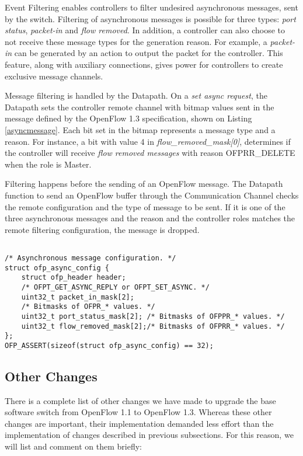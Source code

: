     Event Filtering enables controllers to filter undesired asynchronous messages, sent by the switch. Filtering of asynchronous messages is possible for three types: \textit{port status}, \textit{packet-in} and \textit{flow removed}. In addition, a controller can also choose to not receive these message types for the generation reason. For example, a \textit{packet-in} can be generated by an action to output the packet for the controller. This feature, along with auxiliary connections, gives power for controllers to create exclusive message channels.
    
    Message filtering is handled by the Datapath. On a \textit{set async request}, the Datapath sets the controller remote channel with bitmap values sent in the message defined by the OpenFlow 1.3 specification, shown on Listing \ref{asyncmessage}. Each bit set in the bitmap represents a message type and a reason. For instance, a bit with value 4 in \textit{flow_removed_mask[0]}, determines if the controller will receive \textit{flow removed messages} with reason OFPRR_DELETE when the role is Master.  
    
    Filtering happens before the sending of an OpenFlow message. The Datapath function to send an OpenFlow buffer through the Communication Channel checks the remote configuration and the type of message to be sent. If it is one of the three asynchronous messages and the reason and the controller roles matches the remote filtering configuration, the message is dropped. 
    
\begin{lstlisting}[caption={Ethernet parsing in the nbee_link module}, label=asyncmessage,]    

/* Asynchronous message configuration. */
struct ofp_async_config {
    struct ofp_header header;
    /* OFPT_GET_ASYNC_REPLY or OFPT_SET_ASYNC. */
    uint32_t packet_in_mask[2];
    /* Bitmasks of OFPR_* values. */
    uint32_t port_status_mask[2]; /* Bitmasks of OFPPR_* values. */
    uint32_t flow_removed_mask[2];/* Bitmasks of OFPRR_* values. */
};
OFP_ASSERT(sizeof(struct ofp_async_config) == 32);

\end{lstlisting}

\subsection{Other Changes}
\label{sec:sec46}

There is a complete list of other changes we have made to upgrade the base software switch from OpenFlow 1.1 to OpenFlow 1.3. Whereas these other changes are important, their implementation demanded less effort than the implementation of changes described in previous subsections. For this reason, we will list and comment on them briefly:

